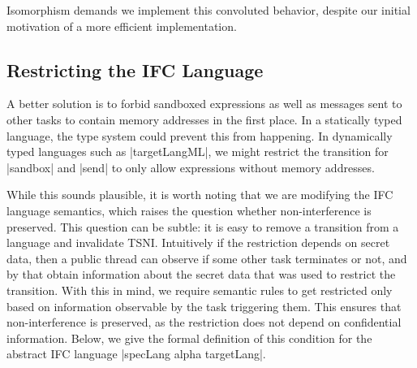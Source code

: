 Isomorphism demands we implement this convoluted behavior,
despite our initial motivation of a more efficient implementation.



\subsection{Restricting the IFC Language}

A better solution is to forbid sandboxed expressions as well
as messages sent to other tasks to contain memory addresses in the
first place.  In a statically typed language, the type system could
prevent this from happening.
In dynamically typed languages such as |targetLangML|, we might
restrict the transition for |sandbox| and |send| to only allow expressions
without memory addresses.

While this sounds plausible, it is worth noting that we are modifying the IFC language semantics,
which raises the question whether non-interference is preserved.
This question can be subtle: it is easy to remove a transition from
a language and invalidate TSNI.  Intuitively
if the restriction depends on secret data, then a public thread
can observe if some other task terminates or not, and by that obtain
information about the secret data that was used to restrict the
transition.
With this in mind, we require semantic rules to get restricted only
based on information observable by the task triggering them.
This ensures that non-interference is preserved, as the
restriction does not depend on confidential information.
Below, we give the formal definition of this condition for the
abstract IFC language |specLang alpha targetLang|.




